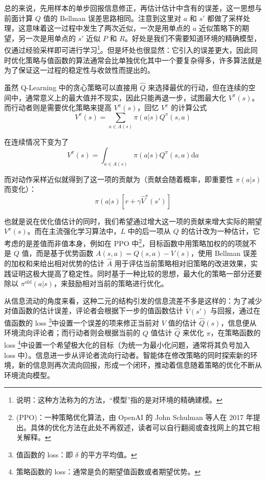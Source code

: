 总的来说，先用样本的单步回报信息修正，再估计估计中含有的误差，这一思想与前面计算 $Q$ 值的 Bellman 误差思路相同。注意到这里对 $a$ 和 $s'$ 都做了采样处理，这意味着这一过程中发生了两次近似，一次是用单点的 $a$ 近似策略下的期望，另一次是用单点的 $s'$ 近似 $P$ 和 $R$。好处是我们不需要知道环境的精确模型，仅通过经验采样即可进行学习\footnote{说明：这种方法称为的方法，“模型”指的是对环境的精确建模。}。但是坏处也很显然：它引入的误差更大，因此同时优化策略与值函数的算法通常会比单独优化其中一个要复杂得多，许多算法就是为了保证这一过程的稳定性与收敛性而提出的。

虽然 Q-Learning 中的贪心策略可以直接用 $\hat Q$ 来选择最优的行动，但在连续的空间中，通常意义上的最大值并不现实，因此只能再退一步，试图最大化 $V^\pi (s)$。而行动者则是需要优化策略来提高 $V^\pi (s)$，回忆 $V^\pi$ 的计算公式
\[
    V^\pi (s) = \sum_{a \in A(s)} \pi(a | s) Q^\pi (s, a)
\]

在连续情况下变为了
\[
    V^\pi (s) = \int_{a \in A(s)} \pi(a | s) Q^\pi (s, a) \mathrm{d}a
\]

而对动作采样近似就得到了这一项的贡献为（贡献会随着概率，即重要性 $\pi(a | s)$ 而变化）：
\[
    \pi(a | s) [r + \gamma \hat V^\pi (s')]
\]

也就是说在优化值估计的同时，我们希望通过增大这一项的贡献来增大实际的期望 $V^\pi (s)$。而在主流强化学习算法中，$L$ 中的后一项从 $Q$ 的估计改为一种估计，它考虑的是差值而非值本身，例如在 PPO 中\footnote{(PPO)：一种策略优化算法，由 OpenAI 的 John Schulman 等人在 2017 年提出。具体的优化方法在此处不再叙述，读者可以自行翻阅或查找网上的其它相关解释。}，目标函数中用策略加权的的项就不是 $Q$ 值，而是基于优势函数 $A(s, a) = Q(s, a) - V(s)$，使用 Bellman 误差的加权和来给出相对优势的估计 $\hat A$ 用于评估当前策略相对旧策略的改进效果，实践证明这极大提高了稳定性。同时基于一种比较的思想，最大化的策略一部分还要除以 $\pi^{\text{old}} (a | s)$，来鼓励相对当前的策略进行优化。

从信息流动的角度来看，这种二元的结构引发的信息流差不多是这样的：为了减少对值函数的估计误差，评论者会根据下一步的值函数估计 $\hat V(s')$ 与回报，通过在值函数的 loss \footnote{值函数的 loss：即 $\delta$ 的平方平均值。}中设置一个误差的项来修正当前对 $V$ 值的估计 $\hat Q(s)$，信息便从环境流向评论者；而行动者则会根据当前的 $Q$ 值估计 $\hat Q$ 来优化 $\pi$，在策略函数的 loss \footnote{策略函数的 loss：通常是负的期望值函数或者期望优势。}中设置一个希望极大化的目标（为统一为最小化问题，通常将其负号加入 loss 中）。信息进一步从评论者流向行动者。智能体在修改策略的同时探索新的环境，新的信息则再次流向回报，形成一个闭环，推动着信息随着策略的优化不断从环境流向模型。

